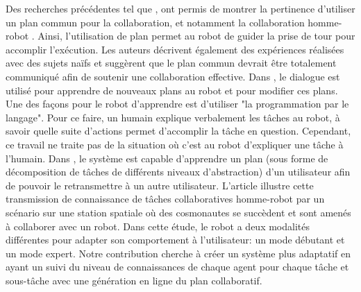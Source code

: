 \documentclass[a4paper,11pt,twoside]{StyleThese}
\begin{document}
Des recherches précédentes tel que \cite{grosz1996collaborative,grosz1999evolution,bratman2013shared}, ont permis de montrer la pertinence d'utiliser un plan commun pour la collaboration, et notamment la collaboration homme-robot \cite{Lallee2013}. Ainsi, l'utilisation de plan permet au robot de guider la prise de tour pour accomplir l'exécution. Les auteurs décrivent également des expériences réalisées avec des sujets naïfs et suggèrent que le plan commun devrait être totalement communiqué afin de soutenir une collaboration effective. Dans \cite{Petit2012}, le dialogue est utilisé pour apprendre de nouveaux plans au robot et pour modifier ces plans. Une des façons pour le robot d'apprendre est d'utiliser "la programmation par le langage". Pour ce faire, un humain explique verbalement les tâches au robot, à savoir quelle suite d'actions permet d'accomplir la tâche en question. Cependant, ce travail ne traite pas de la situation où c'est au robot d'expliquer une tâche à l'humain.
Dans \cite{Sorce2015}, le système est capable d'apprendre un plan (sous forme de décomposition de tâches de différents niveaux d'abstraction) d'un utilisateur afin de pouvoir le retransmettre à un autre utilisateur. L'article illustre cette transmission de connaissance de tâches collaboratives homme-robot par un scénario sur une station spatiale où des cosmonautes se succèdent et sont amenés à collaborer avec un robot. Dans cette étude, le robot a deux modalités différentes pour adapter son comportement à l'utilisateur: un mode débutant et un mode expert.
Notre contribution cherche à créer un système plus adaptatif en ayant un suivi du niveau de connaissances de chaque agent pour chaque tâche et sous-tâche avec une génération en ligne du plan collaboratif.


\end{document}
